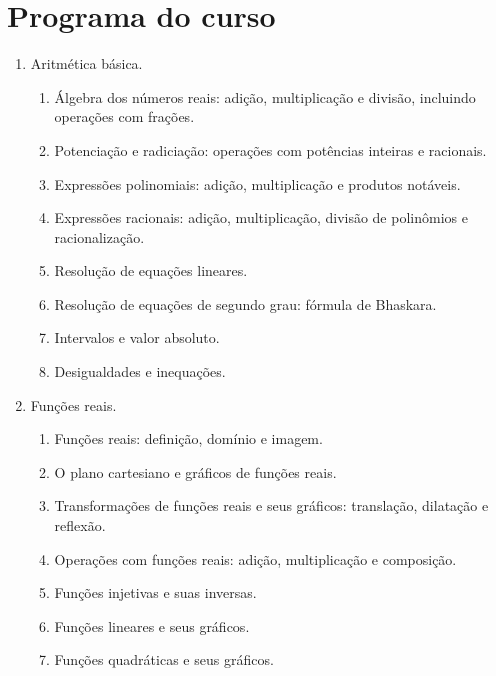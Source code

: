
\chapter{Programa do curso}

\begin{small}
\begin{enumerate}
\item Aritmética básica.
\begin{enumerate}[1.1]
\item Álgebra dos números reais: adição, multiplicação e divisão, incluindo operações com frações.
\item Potenciação e radiciação: operações com potências inteiras e racionais.
\item Expressões polinomiais: adição, multiplicação e produtos notáveis.
\item Expressões racionais: adição, multiplicação, divisão de polinômios e racionalização.
\item Resolução de equações lineares.
\item Resolução de equações de segundo grau: fórmula de Bhaskara.
\item Intervalos e valor absoluto.
\item Desigualdades e inequações.
\end{enumerate}

\item Funções reais.
\begin{enumerate}[2.1]
\item Funções reais: definição, domínio e imagem.
\item O plano cartesiano e gráficos de funções reais.
\item Transformações de funções reais e seus gráficos: translação, dilatação e reflexão.
\item Operações com funções reais: adição, multiplicação e composição.
\item Funções injetivas e suas inversas.
\item Funções lineares e seus gráficos.
\item Funções quadráticas e seus gráficos.
\end{enumerate}


\end{enumerate}
\end{small}
